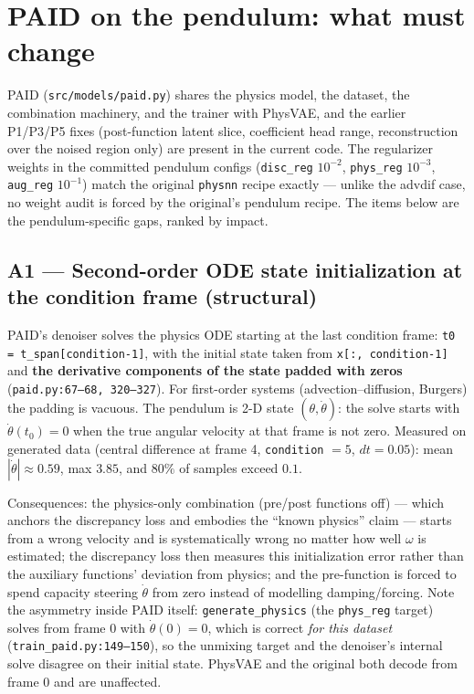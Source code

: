 \documentclass[11pt,a4paper]{article}
\newcommand{\code}[1]{\texttt{#1}}
\begin{document}
\section{PAID on the pendulum: what must change}
\label{sec:paid}

PAID (\code{src/models/paid.py}) shares the physics model, the dataset, the
combination machinery, and the trainer with PhysVAE, and the earlier P1/P3/P5
fixes (post-function latent slice, coefficient head range, reconstruction
over the noised region only) are present in the current code. The regularizer
weights in the committed pendulum configs (\code{disc\_reg} $10^{-2}$,
\code{phys\_reg} $10^{-3}$, \code{aug\_reg} $10^{-1}$) match the original
\code{physnn} recipe exactly --- unlike the advdif case, no weight audit is
forced by the original's pendulum recipe. The items below are the
pendulum-specific gaps, ranked by impact.

\subsection*{A1 --- Second-order ODE state initialization at the condition frame (structural)}

PAID's denoiser solves the physics ODE starting at the last condition frame:
\code{t0 = t\_span[condition-1]}, with the initial state taken from
\code{x[:, condition-1]} and \textbf{the derivative components of the state
padded with zeros} (\code{paid.py:67--68, 320--327}). For first-order systems
(advection--diffusion, Burgers) the padding is vacuous. The pendulum is
2-D state $(\theta, \dot\theta)$: the solve starts with
$\dot\theta(t_0) = 0$ when the true angular velocity at that frame is not
zero. Measured on generated data (central difference at frame 4,
\code{condition} $= 5$, $dt = 0.05$): mean $|\dot\theta| \approx 0.59$, max
$3.85$, and $80\%$ of samples exceed $0.1$.

Consequences: the physics-only combination (pre/post functions off) --- which
anchors the discrepancy loss and embodies the ``known physics'' claim ---
starts from a wrong velocity and is systematically wrong no matter how well
$\omega$ is estimated; the discrepancy loss then measures this initialization
error rather than the auxiliary functions' deviation from physics; and the
pre-function is forced to spend capacity steering $\dot\theta$ from zero
instead of modelling damping/forcing. Note the asymmetry inside PAID itself:
\code{generate\_physics} (the \code{phys\_reg} target) solves from frame 0
with $\dot\theta(0) = 0$, which is correct \emph{for this dataset}
(\code{train\_paid.py:149--150}), so the unmixing target and the denoiser's
internal solve disagree on their initial state. PhysVAE and the original both
decode from frame 0 and are unaffected.
\end{document}
